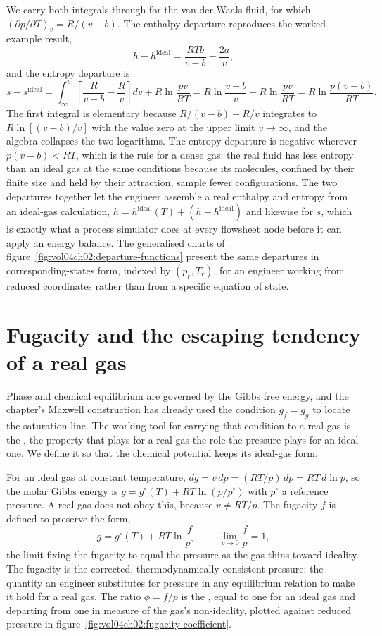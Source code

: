 We carry both integrals through for the van der Waals fluid, for which
$(\partial p/\partial T)_v = R/(v-b)$. The enthalpy departure reproduces
the worked-example result,
\[
h - h^{\text{ideal}} = \frac{RTb}{v-b} - \frac{2a}{v},
\]
and the entropy departure is
\[
s - s^{\text{ideal}} = \int_{\infty}^{v}\left[\frac{R}{v-b} -
\frac{R}{v}\right]dv + R\ln\frac{pv}{RT} = R\ln\frac{v-b}{v} +
R\ln\frac{pv}{RT} = R\ln\frac{p(v-b)}{RT}.
\]
The first integral is elementary because $R/(v-b) - R/v$ integrates to
$R\ln[(v-b)/v]$ with the value zero at the upper limit $v\to\infty$, and
the algebra collapses the two logarithms. The entropy departure is
negative wherever $p(v-b) < RT$, which is the rule for a dense gas: the
real fluid has less entropy than an ideal gas at the same conditions
because its molecules, confined by their finite size and held by their
attraction, sample fewer configurations. The two departures together let
the engineer assemble a real enthalpy and entropy from an ideal-gas
calculation, $h = h^{\text{ideal}}(T) + (h - h^{\text{ideal}})$ and
likewise for $s$, which is exactly what a process simulator does at every
flowsheet node before it can apply an energy balance. The generalised
charts of figure~\ref{fig:vol04ch02:departure-functions} present the same
departures in corresponding-states form, indexed by $(p_r, T_r)$, for an
engineer working from reduced coordinates rather than from a specific
equation of state.



\section{Fugacity and the escaping tendency of a real gas}

Phase and chemical equilibrium are governed by the Gibbs free energy, and
the chapter's Maxwell construction has already used the condition $g_f =
g_g$ to locate the saturation line. The working tool for carrying that
condition to a real gas is the , the property that plays
for a real gas the role the pressure plays for an ideal one. We define it
so that the chemical potential keeps its ideal-gas form.

For an ideal gas at constant temperature, $dg = v\,dp = (RT/p)\,dp = RT\,d
\ln p$, so the molar Gibbs energy is $g = g^{\circ}(T) + RT\ln(p/p^{\circ})$
with $p^{\circ}$ a reference pressure. A real gas does not obey this,
because $v \neq RT/p$. The fugacity $f$ is defined to preserve the form,
\[
g = g^{\circ}(T) + RT\ln\frac{f}{p^{\circ}}, \qquad \lim_{p\to 0}\frac{f}{p}
= 1,
\]
the limit fixing the fugacity to equal the pressure as the gas thins toward
ideality. The fugacity is the corrected, thermodynamically consistent
pressure: the quantity an engineer substitutes for pressure in any
equilibrium relation to make it hold for a real gas. The ratio $\phi = f/p$
is the , equal to one for an ideal gas and
departing from one in measure of the gas's non-ideality, plotted against
reduced pressure in figure~\ref{fig:vol04ch02:fugacity-coefficient}.

